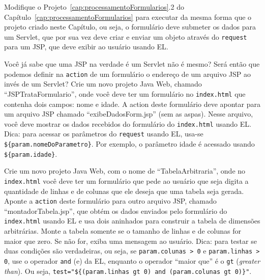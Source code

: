 \begin{projetoSemArquivo}{}{}{}
    Modifique o Projeto~\ref{cap:processamentoFormularios}.2 do Capítulo~\ref{cap:processamentoFormularios} para executar da mesma forma que o projeto criado neste Capítulo, ou seja, o formulário deve submeter os dados para um Servlet, que por sua vez deve criar e enviar um objeto através do \texttt{request} para um JSP, que deve exibir ao usuário usando EL.
\end{projetoSemArquivo}

\begin{projetoSemArquivo}{}{}{}
    Você já sabe que uma JSP na verdade é um Servlet não é mesmo? Será então que podemos definir na \texttt{action} de um formulário o endereço de um arquivo JSP ao invés de um Servlet? Crie um novo projeto Java Web, chamado ``JSPTrataFormulario'', onde você deve ter um formulário no \texttt{index.html} que contenha dois campos: nome e idade. A action deste formulário deve apontar para um arquivo JSP chamado ``exibeDadosForm.jsp'' (sem as aspas). Nesse arquivo, você deve mostrar os dados recebidos do formulário do \texttt{index.html} usando EL. Dica: para acessar os parâmetros do \texttt{request} usando EL, usa-se \texttt{\$\{param.nomeDoParametro\}}. Por exemplo, o parâmetro idade é acessado usando \texttt{\$\{param.idade\}}.
\end{projetoSemArquivo}

\begin{projetoSemArquivo}{}{}{}
    Crie um novo projeto Java Web, com o nome de ``TabelaArbitraria'', onde no \texttt{index.html} você deve ter um formulário que pede ao usuário que seja digita a quantidade de linhas e de colunas que ele deseja que uma tabela seja gerada. Aponte a \texttt{action} deste formulário para outro arquivo JSP, chamado ``montadorTabela.jsp'', que obtém os dados enviados pelo formulário do \texttt{index.html} usando EL e usa dois  aninhados para construir a tabela de dimensões arbitrárias. Monte a tabela somente se o tamanho de linhas e de colunas for maior que zero. Se não for, exiba uma mensagem ao usuário. Dica: para testar se duas condições são verdadeiras, ou seja, se \texttt{param.colunas > 0} e \texttt{param.linhas > 0}, use o operador \texttt{and} (e) da EL, enquanto o operador ``maior que'' é o \texttt{gt} (\textit{greater than}). Ou seja, \texttt{test="\$\{(param.linhas gt 0) and (param.colunas gt 0)\}"}.
\end{projetoSemArquivo}